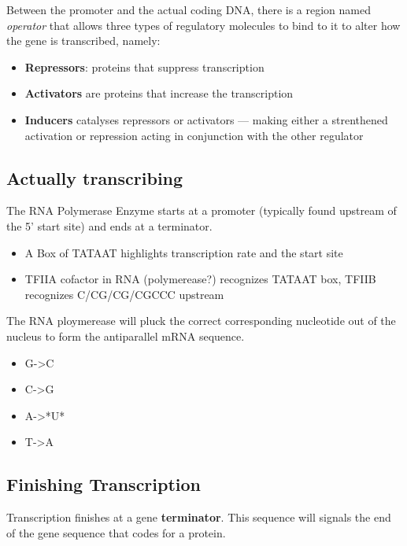 \documentclass[letterpaper]{article}
\begin{document}
Between the promoter and the actual coding DNA, there is a region named
\emph{operator} that allows three types of regulatory molecules to bind to it
to alter how the gene is transcribed, namely:

\begin{itemize}
\item \textbf{Repressors}: proteins that suppress transcription
\item \textbf{Activators} are proteins that increase the transcription
\item \textbf{Inducers} catalyses repressors or activators --- making either a
strenthened activation or repression acting in conjunction with the
other regulator
\end{itemize}

\subsection{Actually transcribing}
\label{sec:org8c0a122}
The RNA Polymerase Enzyme starts at a promoter (typically found upstream
of the 5' start site) and ends at a terminator.

\begin{itemize}
\item A Box of TATAAT highlights transcription rate and the start site
\item TFIIA cofactor in RNA (polymerease?) recognizes TATAAT box, TFIIB
recognizes C/CG/CG/CGCCC upstream
\end{itemize}

The RNA ploymerease will pluck the correct corresponding nucleotide out
of the nucleus to form the antiparallel mRNA sequence.

\begin{itemize}
\item G->C
\item C->G
\item A->*U*
\item T->A
\end{itemize}

\subsection{Finishing Transcription}
\label{sec:org641ceb6}
Transcription finishes at a gene \textbf{terminator}. This sequence will
signals the end of the gene sequence that codes for a protein.
\end{document}
